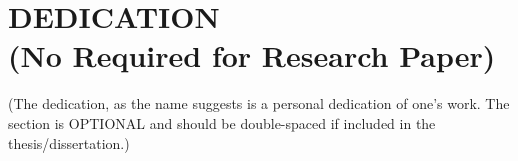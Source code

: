 
\chapter*{DEDICATION \\
(\small No Required for Research Paper)}


   (The dedication, as the name suggests is a personal dedication of one's work.  The section is OPTIONAL and should be double-spaced if included in the thesis/dissertation.)


\newpage
